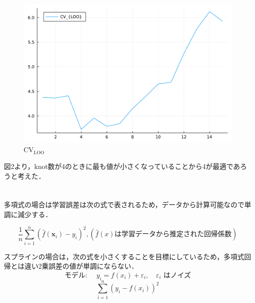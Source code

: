 \documentclass[dvipdfmx]{ujarticle}
\begin{document}
\begin{figure}[htbp]
    \centering
    \includegraphics[width=.7\textwidth]{Result/CVLOO.pdf}
    \caption{$\mathrm{CV_{LOO}}$}
\end{figure}

図2より，knot数が4のときに最も値が小さくなっていることから4が最適であろうと考えた．

\section{}

多項式の場合は学習誤差は次の式で表されるため，データから計算可能なので単調に減少する．

\begin{equation}
\frac{1}{n} \sum_{i=1}^{n}\left(\hat{f}\left(\boldsymbol{x}_{i}\right)-y_{i}\right)^{2} , (\hat{f}(x)は学習データから推定された回帰係数)
\end{equation}

スプラインの場合は，次の式を小さくすることを目標にしているため，多項式回帰とは違い2乗誤差の値が単調にならない．
\[
\text { モデル: } \quad y_{i}=f\left(x_{i}\right)+\varepsilon_{i}, \quad \varepsilon_{i} \text { はノイズ }
\]
\begin{equation}
\sum_{i=1}^{n}\left(y_{i}-f\left(x_{i}\right)\right)^{2}
\end{equation}
\end{document}
